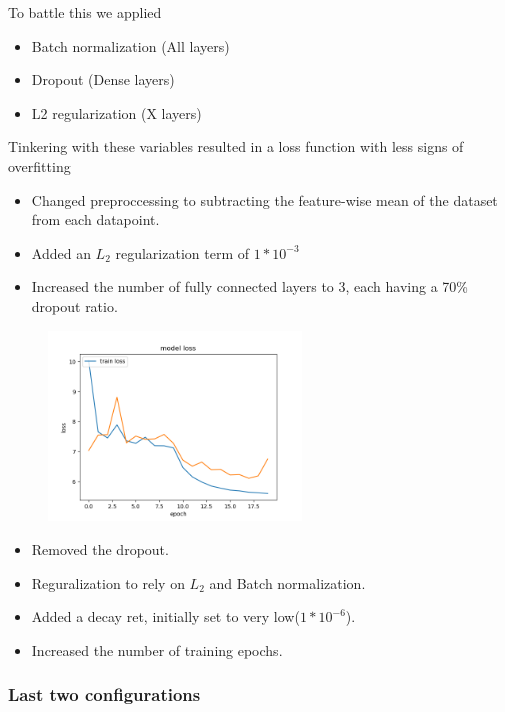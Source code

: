 \documentclass{beamer}
\begin{document}
\begin{frame}
  To battle this we applied
  \begin{itemize}
    \item Batch normalization (All layers)
    \item Dropout (Dense layers)
    \item L2 regularization (X layers)
  \end{itemize}
  Tinkering with these variables resulted in a loss function with less signs of overfitting
\end{frame}

\begin{frame}
  \begin{itemize}
    \item  Changed preproccessing to subtracting the feature-wise mean of the dataset from each datapoint.
    \item Added an $L_{2}$ regularization term of $1*10^{-3}$
    \item Increased the number of fully connected layers to 3, each having a 70\% dropout ratio.
  \end{itemize}

  \begin{figure}[!h]
  \centering
  \includegraphics[width=0.6\textwidth]{images/improved_loss_1.png}
  \end{figure}
\end{frame}


\begin{frame}
  \begin{itemize}
    \item Removed the dropout.
    \item Reguralization to rely on $L_{2}$ and Batch normalization.
    \item Added a decay ret, initially set to very low($1*10^{-6}$).
    \item Increased the number of training epochs. 
  \end{itemize}
\end{frame}

\begin{frame}
  \frametitle{Last two configurations}
  

\end{frame}
\end{document}
